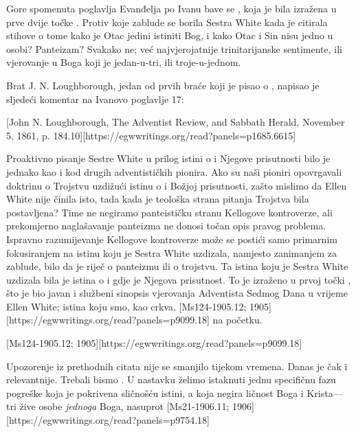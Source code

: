 Gore spomenuta poglavlja Evanđelja po Ivanu bave se , koja je bila izražena u prve dvije točke . Protiv koje zablude se borila Sestra White kada je citirala stihove o tome kako je Otac jedini istiniti Bog, i kako Otac i Sin nisu jedno u osobi? Panteizam? Svakako ne; već najvjerojatnije trinitarijanske sentimente, ili vjerovanje u Boga koji je jedan-u-tri, ili troje-u-jednom.

Brat J. N. Loughborough, jedan od prvih braće koji je pisao o , napisao je sljedeći komentar na Ivanovo poglavlje 17:

[John N. Loughborough, The Adventist Review, and Sabbath Herald, November 5, 1861, p. 184.10][https://egwwritings.org/read?panels=p1685.6615]

Proaktivno pisanje Sestre White u prilog istini o  i Njegove prisutnosti bilo je jednako kao i kod drugih adventističkih pionira. Ako su naši pioniri opovrgavali doktrinu o Trojstvu uzdižući istinu o  i Božjoj prisutnosti, zašto mislimo da Ellen White nije činila isto, tada kada je teološka strana pitanja Trojstva bila postavljena? Time ne negiramo panteističku stranu Kellogove kontroverze, ali prekomjerno naglašavanje panteizma ne donosi točan opis pravog problema. Ispravno razumijevanje Kellogove kontroverze može se postići samo primarnim fokusiranjem na istinu koju je Sestra White uzdizala, namjesto zanimanjem za zablude, bilo da je riječ o panteizmu ili o trojstvu. Ta istina koju je Sestra White uzdizala bila je istina o  i gdje je Njegova prisutnost. To je izraženo u prvoj točki , što je bio javan i službeni sinopsis vjerovanja Adventista Sedmog Dana u vrijeme Ellen White; istina koju smo, kao crkva, [Ms124-1905.12; 1905][https://egwwritings.org/read?panels=p9099.18] na početku.

[Ms124-1905.12; 1905][https://egwwritings.org/read?panels=p9099.18]

Upozorenje iz prethodnih citata nije se smanjilo tijekom vremena. Danas je čak i relevantnije. Trebali bismo . U nastavku želimo istaknuti jednu specifičnu fazu pogreške koja je pokrivena sličnošću istini, a koja negira ličnost Boga i Krista—tri žive osobe \textit{jednoga} Boga, nasuprot [Ms21-1906.11; 1906][https://egwwritings.org/read?panels=p9754.18]

